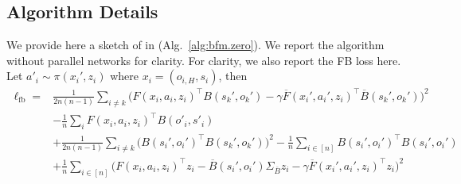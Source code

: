 



\subsection{\method Algorithm Details}
We provide here a sketch of \method in (Alg.~\ref{alg:bfm.zero}). We report the algorithm without parallel networks for clarity. For clarity, we also report the FB loss here. Let $a'_i \sim \pi(x_i', z_i)$ where $x_i = (o_{i,H},s_i)$, then 
\begin{equation}
\label{eq:fb.loss}
    \begin{aligned}
        \ell_{\mathrm{fb}} =&
        \frac{1}{2n(n-1)}  \sum_{i\neq k}\Big( F(x_i,a_i,z_i)^\top B(s_k',o_k')  - \gamma \overline{F}(x_i',a_i',z_i)^\top \overline{B}(s_k',o_k') \Big)^2\\
        & - \frac{1}{n} \sum_{i} F(x_i, a_i, z_i)^\top B(o'_{i}, s'_{i}) \\
        &+\frac{1}{2n(n-1)}  \sum_{i\neq k}\Big(B(s_i',o_i')^\top B(s_k',o_k')\Big)^2 - \frac{1}{n} \sum_{i\in[n]} B(s_i',o_i')^\top B(s_i',o_i')\\
        &+\frac{1}{n} \sum_{i\in[n]} \Big( F(x_i,a_i,z_i)^\top z_i - \overline{B}(s_i', o_i')\Sigma_{\overline{B}} z_i -\gamma \overline{F}(x_i',a_i',z_i)^\top z_i \Big)^2
    \end{aligned}
\end{equation}

